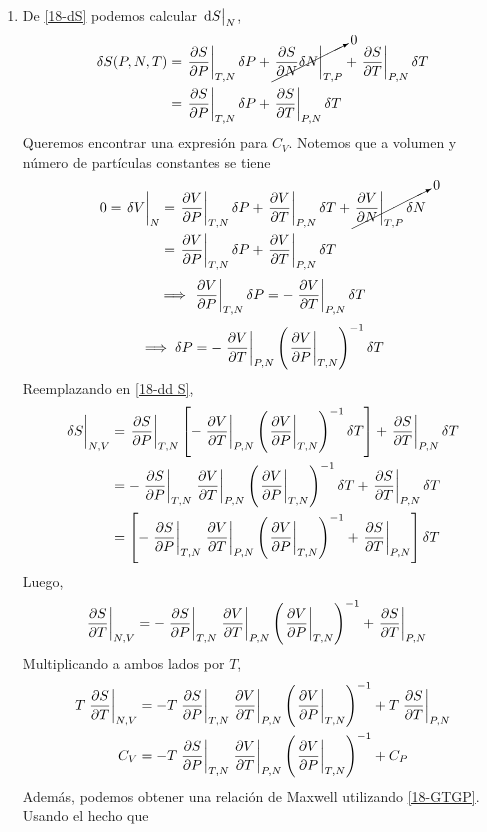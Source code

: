 \begin{sol}
\begin{enumerate}
\item
De \eqref{18-dS} podemos calcular $\eval{\dd S}_N$,
\begin{align}
  \d S(P,N,T)&=\eval{\pdv{S}{P}}_{T,N}\d P+\cancelto{0}{\eval{\pdv{S}{N}\d N}_{T,P}}+\eval{\pdv{S}{T}}_{P,N}\d T\\
  &=\eval{\pdv{S}{P}}_{T,N}\d P+\eval{\pdv{S}{T}}_{P,N}\d T \label{18-dd S}
\end{align}
Queremos encontrar una expresión para $C_V$. Notemos que a volumen y número de partículas constantes se tiene
\begin{align}
  0=\eval{\d V}_N&=\eval{\pdv{V}{P}}_{T,N}\d P+\eval{\pdv{V}{T}}_{P,N}\d T+\cancelto{0}{\eval{\pdv{V}{N}}_{T,P}\d N}\\
  &=\eval{\pdv{V}{P}}_{T,N}\d P+\eval{\pdv{V}{T}}_{P,N}\d T
\end{align}
\begin{equation}
  \implies \eval{\pdv{V}{P}}_{T,N}\d P=-\eval{\pdv{V}{T}}_{P,N}\d T
\end{equation}
\begin{equation}
  \implies \d P=-\eval{\pdv{V}{T}}_{P,N}\left(\eval{\pdv{V}{P}}_{T,N}\right)^{-1}\d T
\end{equation}
Reemplazando en \eqref{18-dd S},
\begin{align}
  \eval{\d S}_{N,V}&=\eval{\pdv{S}{P}}_{T,N}\left[-\eval{\pdv{V}{T}}_{P,N}\left(\eval{\pdv{V}{P}}_{T,N}\right)^{-1}\d T\right]+\eval{\pdv{S}{T}}_{P,N}\d T\\
  &=-\eval{\pdv{S}{P}}_{T,N}\eval{\pdv{V}{T}}_{P,N}\left(\eval{\pdv{V}{P}}_{T,N}\right)^{-1}\d T+\eval{\pdv{S}{T}}_{P,N}\d T\\
  &=\left[-\eval{\pdv{S}{P}}_{T,N}\eval{\pdv{V}{T}}_{P,N}\left(\eval{\pdv{V}{P}}_{T,N}\right)^{-1}+\eval{\pdv{S}{T}}_{P,N}\right]\d T
\end{align}
Luego,
\begin{align}
  \eval{\pdv{S}{T}}_{N,V}&=-\eval{\pdv{S}{P}}_{T,N}\eval{\pdv{V}{T}}_{P,N}\left(\eval{\pdv{V}{P}}_{T,N}\right)^{-1}+\eval{\pdv{S}{T}}_{P,N}
\end{align}
Multiplicando a ambos lados por $T$,
\begin{align}\label{18-casi}
  T\eval{\pdv{S}{T}}_{N,V}&=-T\eval{\pdv{S}{P}}_{T,N}\eval{\pdv{V}{T}}_{P,N}\left(\eval{\pdv{V}{P}}_{T,N}\right)^{-1}+T\eval{\pdv{S}{T}}_{P,N}\\
  C_V&=-T\eval{\pdv{S}{P}}_{T,N}\eval{\pdv{V}{T}}_{P,N}\left(\eval{\pdv{V}{P}}_{T,N}\right)^{-1}+C_P
\end{align}
Además, podemos obtener una relación de Maxwell utilizando \eqref{18-GTGP}. Usando el hecho que

\end{enumerate}
\end{sol}
